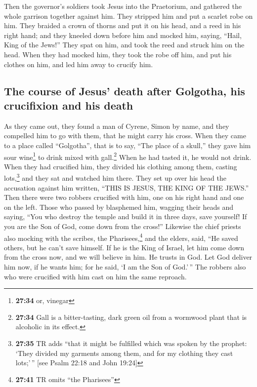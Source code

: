  Then the governor's soldiers took Jesus into the
Praetorium, and gathered the whole garrison together against him.
 They stripped him and put a scarlet robe on him.
 They braided a crown of thorns and put it on his head,
and a reed in his right hand; and they kneeled down before him and
mocked him, saying, ``Hail, King of the Jews!''  They
spat on him, and took the reed and struck him on the head.
 When they had mocked him, they took the robe off him,
and put his clothes on him, and led him away to crucify him.

\hypertarget{the-course-of-jesus-death-after-golgotha-his-crucifixion-and-his-death}{%
\subsection{The course of Jesus' death after Golgotha, his crucifixion
and his
death}\label{the-course-of-jesus-death-after-golgotha-his-crucifixion-and-his-death}}

 As they came out, they found a man of Cyrene, Simon by
name, and they compelled him to go with them, that he might carry his
cross.  When they came to a place called ``Golgotha'',
that is to say, ``The place of a skull,''  they gave him
sour wine\footnote{\textbf{27:34} or, vinegar} to drink mixed with
gall.\footnote{\textbf{27:34} Gall is a bitter-tasting, dark green oil
  from a wormwood plant that is alcoholic in its effect.} When he had
tasted it, he would not drink.  When they had crucified
him, they divided his clothing among them, casting lots,\footnote{\textbf{27:35}
  TR adds ``that it might be fulfilled which was spoken by the prophet:
  `They divided my garments among them, and for my clothing they cast
  lots;'\,'' {[}see Psalm 22:18 and John 19:24{]}}  and
they sat and watched him there.  They set up over his
head the accusation against him written, ``THIS IS JESUS, THE KING OF
THE JEWS.''  Then there were two robbers crucified with
him, one on his right hand and one on the left.  Those
who passed by blasphemed him, wagging their heads  and
saying, ``You who destroy the temple and build it in three days, save
yourself! If you are the Son of God, come down from the cross!''
 Likewise the chief priests also mocking with the
scribes, the Pharisees,\footnote{\textbf{27:41} TR omits ``the
  Pharisees''} and the elders, said,  ``He saved others,
but he can't save himself. If he is the King of Israel, let him come
down from the cross now, and we will believe in him.  He
trusts in God. Let God deliver him now, if he wants him; for he said, `I
am the Son of God.'\,''  The robbers also who were
crucified with him cast on him the same reproach.

